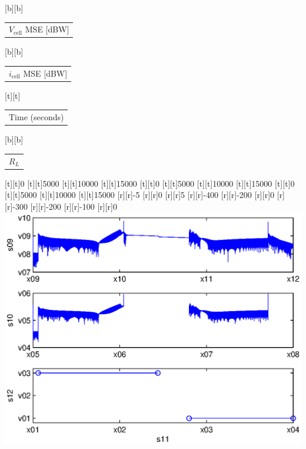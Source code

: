 %    
%
%
\begin{psfrags}%
\psfragscanon%
%
[b][b]{\color[rgb]{0,0,0}\setlength{\tabcolsep}{0pt}\begin{tabular}{c}$V_\text{cell}$ MSE [dBW]\end{tabular}}%
[b][b]{\color[rgb]{0,0,0}\setlength{\tabcolsep}{0pt}\begin{tabular}{c}$i_\text{cell}$ MSE [dBW]\end{tabular}}%
[t][t]{\color[rgb]{0,0,0}\setlength{\tabcolsep}{0pt}\begin{tabular}{c}Time (seconds)\end{tabular}}%
[b][b]{\color[rgb]{0,0,0}\setlength{\tabcolsep}{0pt}\begin{tabular}{c}$R_L$\end{tabular}}%
%
[t][t]{0}%
[t][t]{5000}%
[t][t]{10000}%
[t][t]{15000}%
[t][t]{0}%
[t][t]{5000}%
[t][t]{10000}%
[t][t]{15000}%
[t][t]{0}%
[t][t]{5000}%
[t][t]{10000}%
[t][t]{15000}%
%
[r][r]{-5}%
[r][r]{0}%
[r][r]{5}%
[r][r]{-400}%
[r][r]{-200}%
[r][r]{0}%
[r][r]{-300}%
[r][r]{-200}%
[r][r]{-100}%
[r][r]{0}%
%
\includegraphics[width=15cm]{batt_noise_comp.eps}%
\end{psfrags}%
%
